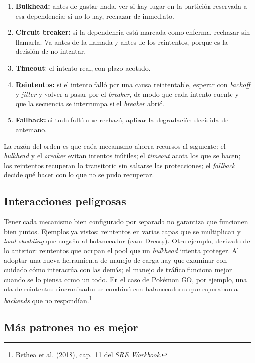 \documentclass[variant=apuntes,cover=institutional,mode=screen]{ua-engineering-v6-article}
\begin{document}
\begin{enumerate}
\item \textbf{Bulkhead:} antes de gastar nada, ver si hay lugar en la partición reservada a esa dependencia; si no lo hay, rechazar de inmediato.
\item \textbf{Circuit breaker:} si la dependencia está marcada como enferma, rechazar sin llamarla. Va antes de la llamada y antes de los reintentos, porque es la decisión de no intentar.
\item \textbf{Timeout:} el intento real, con plazo acotado.
\item \textbf{Reintentos:} si el intento falló por una causa reintentable, esperar con \emph{backoff} y \emph{jitter} y volver a pasar por el \emph{breaker}, de modo que cada intento cuente y que la secuencia se interrumpa si el \emph{breaker} abrió.
\item \textbf{Fallback:} si todo falló o se rechazó, aplicar la degradación decidida de antemano.
\end{enumerate}

La razón del orden es que cada mecanismo ahorra recursos al siguiente: el \emph{bulkhead} y el \emph{breaker} evitan intentos inútiles; el \emph{timeout} acota los que se hacen; los reintentos recuperan lo transitorio sin saltarse las protecciones; el \emph{fallback} decide qué hacer con lo que no se pudo recuperar.

\subsection{Interacciones peligrosas}

Tener cada mecanismo bien configurado por separado no garantiza que funcionen bien juntos. Ejemplos ya vistos: reintentos en varias capas que se multiplican y \emph{load shedding} que engaña al balanceador (caso Dressy). Otro ejemplo, derivado de lo anterior: reintentos que ocupan el pool que un \emph{bulkhead} intenta proteger. Al adoptar una nueva herramienta de manejo de carga hay que examinar con cuidado cómo interactúa con las demás; el manejo de tráfico funciona mejor cuando se lo piensa como un todo. En el caso de Pokémon GO, por ejemplo, una ola de reintentos sincronizados se combinó con balanceadores que esperaban a \emph{backends} que no respondían.\footnote{Bethea et al. (2018), cap.~11 del \emph{SRE Workbook}.}

\subsection{Más patrones no es mejor}
\end{document}
